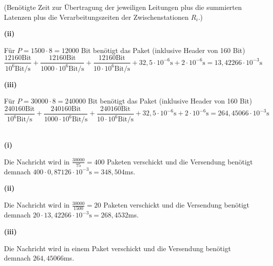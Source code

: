 \documentclass{../exercisesheet}
\begin{document}
\begin{exercise}{5}
\begin{subexercise}
\begin{adjustwidth}{2em}{0em}
\[\]
(Benötigte Zeit zur Übertragung der jeweiligen Leitungen plus die summierten Latenzen plus die Verarbeitungszeiten der Zwischenstationen $R_i$.)
\end{adjustwidth}
\textbf{(ii)}
\begin{adjustwidth}{2em}{0em}\vspace{-\baselineskip}
Für $P=1500 \cdot 8=12000$ Bit benötigt das Paket (inklusive Header von 160 Bit)
\[
\frac{12160 \text{Bit}}{10^6 \text{Bit/s}} + \frac{12160 \text{Bit}}{1000 \cdot 10^6 \text{Bit/s}} + \frac{12160 \text{Bit}}{10 \cdot 10^6 \text{Bit/s}} + 32,5 \cdot 10^{-6}\text{s} + 
2 \cdot 10^{-6}\text{s} = 13,42266 \cdot 10^{-3}\text{s}
\]
\end{adjustwidth}
\textbf{(iii)}
\begin{adjustwidth}{2em}{0em}\vspace{-\baselineskip}
Für $P=30000 \cdot 8=240000$ Bit benötigt das Paket (inklusive Header von 160 Bit)
\[
\frac{240160 \text{Bit}}{10^6 \text{Bit/s}} + \frac{240160 \text{Bit}}{1000 \cdot 10^6 \text{Bit/s}} + \frac{240160 \text{Bit}}{10 \cdot 10^6 \text{Bit/s}} + 32,5 \cdot 10^{-6}\text{s}
+ 2 \cdot 10^{-6}\text{s} = 264,45066 \cdot 10^{-3}\text{s}
\] \ \\
\end{adjustwidth}
\end{subexercise}
\begin{subexercise}
\textbf{(i)}
\begin{adjustwidth}{2em}{0em}\vspace{-\baselineskip}
Die Nachricht wird in $\frac{30000}{75}=400$ Paketen verschickt und die Versendung benötigt demnach $400 \cdot 0,87126 \cdot 10^{-3}\text{s}=348,504$ms.
\end{adjustwidth}
\textbf{(ii)}
\begin{adjustwidth}{2em}{0em}\vspace{-\baselineskip}
Die Nachricht wird in $\frac{30000}{1500}=20$ Paketen verschickt und die Versendung benötigt demnach $20 \cdot 13,42266 \cdot 10^{-3}\text{s}=268,4532$ms.
\end{adjustwidth}
\textbf{(iii)}
\begin{adjustwidth}{2em}{0em}\vspace{-\baselineskip}
Die Nachricht wird in einem Paket verschickt und die Versendung benötigt demnach $264,45066$ms.
\end{adjustwidth}
\end{subexercise}
\end{exercise}
\end{document}
